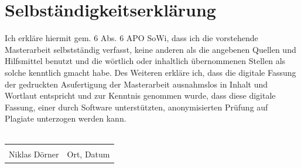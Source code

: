 \documentclass[a4paper, 11 pt, fleqn]{article}
\begin{document}
\newpage
\section*{Selbständigkeitserklärung}
Ich erkläre hiermit gem. \text{\S}6 Abs. 6 APO SoWi, dass ich die vorstehende Masterarbeit selbstständig verfasst, keine anderen
als die angebenen Quellen und Hilfsmittel benutzt und die wörtlich oder inhaltlich übernommenen Stellen als solche kenntlich
gmacht habe. Des Weiteren erkläre ich, dass die digitale Fassung der gedruckten Asufertigung der Masterarbeit ausnahmslos
in Inhalt und Wortlaut entspricht und zur Kenntnis genommen wurde, dass diese digitale Fassung, einer durch Software
unterstützten, anonymisierten Prüfung auf Plagiate unterzogen werden kann. \\
\vspace*{1 cm}
\\
\noindent\begin{tabular}{ll}
	\makebox[2.5in]{\hrulefill} & \makebox[2.5in]{\hrulefill}\\
	Niklas D\"orner & Ort, Datum\\[8ex]%
\end{tabular}
%
\end{document}
